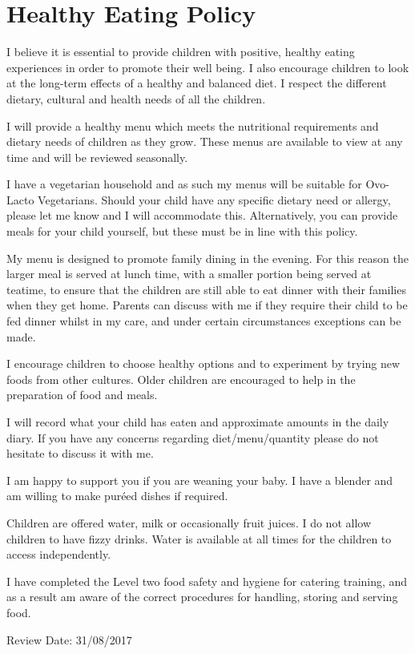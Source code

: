 

\section{Healthy Eating Policy}

I believe it is essential to provide children with positive, healthy
eating experiences in order to promote their well being. I also
encourage children to look at the long-term effects of a healthy and
balanced diet. I respect the different dietary, cultural and health
needs of all the children.

I will provide a healthy menu which meets the nutritional requirements
and dietary needs of children as they grow. These menus are available to
view at any time and will be reviewed seasonally.

I have a vegetarian household and as such my menus will be suitable for
Ovo-Lacto Vegetarians. Should your child have any specific dietary need
or allergy, please let me know and I will accommodate this.
Alternatively, you can provide meals for your child yourself, but these
must be in line with this policy.

My menu is designed to promote family dining in the evening. For this
reason the larger meal is served at lunch time, with a smaller portion
being served at teatime, to ensure that the children are still able to
eat dinner with their families when they get home. Parents can discuss
with me if they require their child to be fed dinner whilst in my care,
and under certain circumstances exceptions can be made.

I encourage children to choose healthy options and to experiment by
trying new foods from other cultures. Older children are encouraged to
help in the preparation of food and meals.

I will record what your child has eaten and approximate amounts in the
daily diary. If you have any concerns regarding diet/menu/quantity
please do not hesitate to discuss it with me.

I am happy to support you if you are weaning your baby. I have a blender
and am willing to make puréed dishes if required.

Children are offered water, milk or occasionally fruit juices. I do not
allow children to have fizzy drinks. Water is available at all times for
the children to access independently.

I have completed the Level two food safety and hygiene for catering
training, and as a result am aware of the correct procedures for
handling, storing and serving food.

Review Date: 31/08/2017


